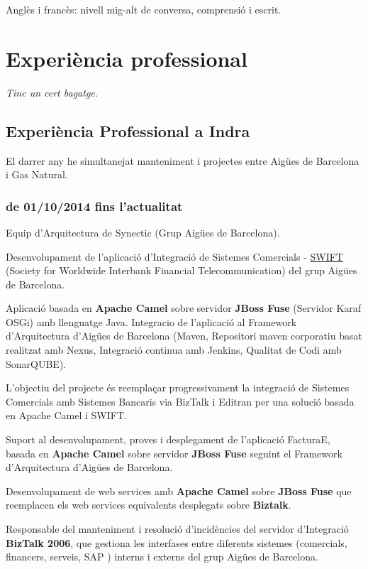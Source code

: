 \documentclass[11pt]{article}
\begin{document}
Anglès i francès: nivell mig-alt de conversa, comprensió i escrit.
\section{Experiència professional}
\label{sec-5}

\emph{Tinc un cert bagatge.}
\subsection{Experiència Professional a Indra}
\label{sec-5-1}


El darrer any he simultanejat manteniment i projectes entre Aigües de Barcelona i Gas Natural.
\subsubsection{de 01/10/2014 fins l'actualitat}
\label{sec-5-1-1}

Equip d'Arquitectura de Synectic (Grup Aigües de Barcelona).

Desenvolupament de l'aplicació d'Integració de Sistemes Comercials - \href{https://en.wikipedia.org/wiki/Society_for_Worldwide_Interbank_Financial_Telecommunication}{SWIFT} (Society for Worldwide Interbank Financial Telecommunication) del grup Aigües de Barcelona.

Aplicació basada en \textbf{Apache Camel} sobre servidor \textbf{JBoss Fuse} (Servidor Karaf OSGi) amb llenguatge Java. Integracio de l'aplicació al Framework d'Arquitectura d'Aigües de Barcelona (Maven, Repositori  maven corporatiu basat realitzat amb Nexus, Integració continua amb Jenkins, Qualitat de Codi amb SonarQUBE). 

L'objectiu del projecte és reemplaçar progressivament la integració de Sistemes Comercials amb Sistemes Bancaris via BizTalk i Editran per una solució basada en Apache Camel i SWIFT.

Suport al desenvolupament, proves i desplegament de l'aplicació FacturaE, basada en  \textbf{Apache Camel} sobre servidor \textbf{JBoss Fuse} seguint el Framework d'Arquitectura d'Aigües de Barcelona. 

Desenvolupament de web services amb \textbf{Apache Camel} sobre \textbf{JBoss Fuse} que reemplacen els web services equivalents desplegats sobre \textbf{Biztalk}. 

Responsable del manteniment i resolució d'incidències del servidor d'Integració \textbf{BizTalk 2006}, que gestiona les interfases entre diferents sistemes (comercials, financers, serveis, SAP ) interns i externs del grup Aigües de Barcelona.
\end{document}

